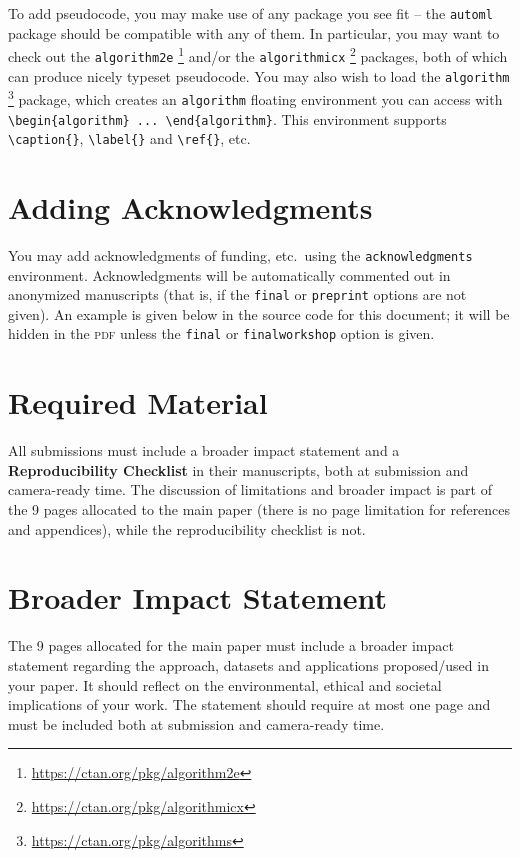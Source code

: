 \documentclass[11pt]{article}
\begin{document}
To add pseudocode, you may make use of any package you see fit -- the
\texttt{automl} package should be compatible with any of them. In particular,
you may want to check out the \texttt{algorithm2e}%
%
\footnote{\url{https://ctan.org/pkg/algorithm2e}}
%
and/or the \texttt{algorithmicx}%
%
\footnote{\url{https://ctan.org/pkg/algorithmicx}}
%
packages, both of which can produce nicely typeset pseudocode. You may also wish
to load the \texttt{algorithm}%
%
\footnote{\url{https://ctan.org/pkg/algorithms}}
%
package, which creates an \texttt{algorithm} floating environment you can access
with \verb|\begin{algorithm} ... \end{algorithm}|. This environment supports
\verb|\caption{}|, \verb|\label{}| and \verb|\ref{}|, etc.

\section{Adding Acknowledgments}

You may add acknowledgments of funding, etc.\ using the \texttt{acknowledgments}
environment. Acknowledgments will be automatically commented out in anonymized
manuscripts (that is, if the \texttt{final} or \texttt{preprint} options are not
given). An example is given below in the source code for this document; it will
be hidden in the \textsc{pdf} unless the \texttt{final} or
\texttt{finalworkshop} option is given.

\section{Required Material}

All submissions must include a broader impact statement and a
\textbf{Reproducibility Checklist} in their manuscripts, both at submission and
camera-ready time.  The discussion of limitations and broader impact is part of
the 9 pages allocated to the main paper (there is no page limitation for
references and appendices), while the reproducibility checklist is not.

\section{Broader Impact Statement}

The 9 pages allocated for the main paper must include a broader impact statement
regarding the approach, datasets and applications proposed/used in your
paper. It should reflect on the environmental, ethical and societal implications
of your work. The statement should require at most one page and must be included
both at submission and camera-ready time.
\end{document}

